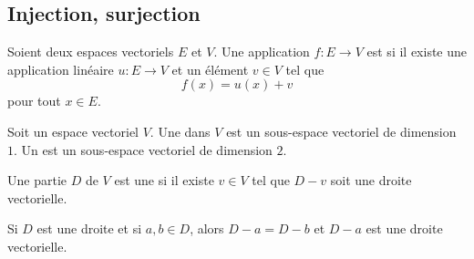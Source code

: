 \subsection{Injection, surjection}

\begin{definition}      \label{DEFooVTXWooVXfUnc}
    Soient deux espaces vectoriels \( E\) et \( V\). Une application \( f\colon E\to V\) est  si il existe une application linéaire \( u\colon E \to V\) et un élément \( v\in V\) tel que
    \begin{equation}
        f(x)=u(x)+v
    \end{equation}
    pour tout \( x\in E\).
\end{definition}


\begin{definition}
    Soit un espace vectoriel \( V\). Une  dans \( V\) est un sous-espace vectoriel de dimension \( 1\). Un  est un sous-espace vectoriel de dimension \( 2\).

    Une partie \( D\) de \( V\) est une  si il existe \( v\in V\) tel que \( D-v\) soit une droite vectorielle.
\end{definition}

\begin{lemma}       \label{LEMooQQFFooEZYeck}
    Si \( D\) est une droite et si \( a,b\in D\), alors \( D-a=D-b\) et \( D-a\) est une droite vectorielle.
\end{lemma}

